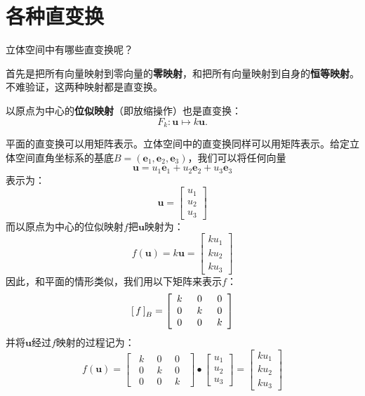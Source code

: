 \documentclass[12pt,UTF8]{ctexbook}
\begin{document}
\section{各种直变换}

立体空间中有哪些直变换呢？

首先是把所有向量映射到零向量的\textbf{零映射}，和把所有向量映射到自身的\textbf{恒等映射}。
不难验证，这两种映射都是直变换。

以原点为中心的\textbf{位似映射}（即放缩操作）也是直变换：
$$ F_k : \mathbf{u} \mapsto k\mathbf{u}.$$

平面的直变换可以用矩阵表示。立体空间中的直变换同样可以用矩阵表示。给定立体空间直角坐标系的基底$B = (\mathbf{e}_1, \mathbf{e}_2, \mathbf{e}_3)$，我们可以将任何向量
$$ \mathbf{u} = u_1\mathbf{e}_1 + u_2\mathbf{e}_2 + u_3\mathbf{e}_3$$
表示为：
$$ \mathbf{u} = \begin{bmatrix}
    u_1 \\ u_2 \\ u_3
\end{bmatrix} $$
而以原点为中心的位似映射$f$把$\mathbf{u}$映射为：
$$ f(\mathbf{u}) =  k\mathbf{u} = \begin{bmatrix}
    ku_1 \\ ku_2 \\ ku_3
\end{bmatrix} $$
因此，和平面的情形类似，我们用以下矩阵来表示$f$：
$$
\bmat{f}[B] = \begin{bmatrix}
    \phantom{0}k & \phantom{0}0\phantom{0} & 0\phantom{0} \\ \phantom{0}0 & \phantom{0}k\phantom{0} & 0\phantom{0} \\ \phantom{0}0 & \phantom{0}0\phantom{0} & k\phantom{0}
\end{bmatrix}
$$
并将$\mathbf{u}$经过$f$映射的过程记为：
$$
f(\mathbf{u}) = \begin{bmatrix}
    \phantom{0}k & \phantom{0}0\phantom{0} & 0\phantom{0} \\ \phantom{0}0 & \phantom{0}k\phantom{0} & 0\phantom{0} \\ \phantom{0}0 & \phantom{0}0\phantom{0} & k\phantom{0}
\end{bmatrix} \bullet \begin{bmatrix}
    u_1 \\ u_2 \\ u_3
\end{bmatrix} = \begin{bmatrix}
    ku_1 \\ ku_2 \\ ku_3
\end{bmatrix}
$$
\end{document}
